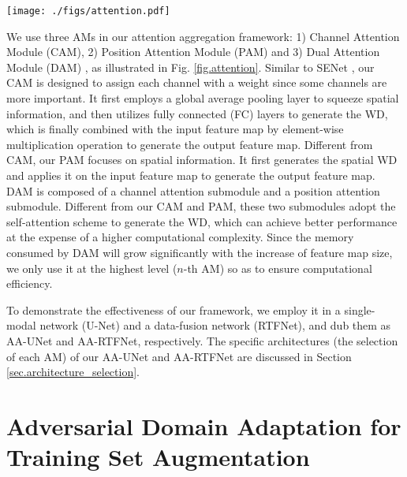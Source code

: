 \documentclass[runningheads]{llncs}
\begin{document}
\begin{figure*}[t]
    \centering
    \texttt{[image: ./figs/attention.pdf]}
    \caption{The illustrations of the three AMs used in our attention aggregation framework.}
    \label{fig.attention}
\end{figure*}

We use three AMs in our attention aggregation framework: 1) Channel Attention Module (CAM), 2) Position Attention Module (PAM) and 3) Dual Attention Module (DAM) \cite{fu2019dual}, as illustrated in Fig. \ref{fig.attention}. Similar to SENet \cite{hu2018squeeze}, our CAM is designed to assign each channel with a weight since some channels are more important. It first employs a global average pooling layer to squeeze spatial information, and then utilizes fully connected (FC) layers to generate the WD, which is finally combined with the input feature map by element-wise multiplication operation to generate the output feature map. Different from CAM, our PAM focuses on spatial information. It first generates the spatial WD and applies it on the input feature map to generate the output feature map. DAM \cite{fu2019dual} is composed of a channel attention submodule and a position attention submodule. Different from our CAM and PAM, these two submodules adopt the self-attention scheme to generate the WD, which can achieve better performance at the expense of a higher computational complexity. Since the memory consumed by DAM will grow significantly with the increase of feature map size, we only  use it at the highest level ($n$-th AM) so as to ensure computational efficiency.

To demonstrate the effectiveness of our framework, we employ it in a single-modal network (U-Net) and a data-fusion network (RTFNet), and dub them as AA-UNet and AA-RTFNet, respectively. The specific architectures (the selection of each AM) of our AA-UNet and AA-RTFNet are discussed  in Section \ref{sec.architecture_selection}.


\section{Adversarial Domain Adaptation for Training Set Augmentation}
\label{sec.gan_data_augmentation}
\end{document}
